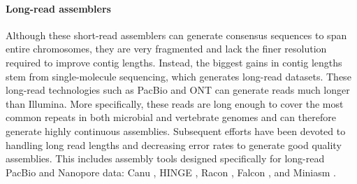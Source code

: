 \paragraph{Long-read assemblers}
Although these short-read assemblers can generate consensus sequences to span entire chromosomes, they are very fragmented and lack the finer resolution required to improve contig lengths. 
Instead, the biggest gains in contig lengths stem from single-molecule sequencing, which generates long-read datasets.
These long-read technologies such as PacBio and ONT can generate reads much longer than Illumina. 
More specifically, these reads are long enough to cover the most common repeats in both microbial and vertebrate genomes and can therefore generate highly continuous assemblies. 
Subsequent efforts have been devoted to handling long read lengths and decreasing error rates to generate good quality assemblies.
This includes assembly tools designed specifically for long-read PacBio and Nanopore data: Canu \citep{koren2017canu}, HINGE \citep{kamath2017hinge}, Racon \citep{vaser2017fast}, Falcon \citep{chin2016phased}, and Miniasm \citep{li2016minimap}.

